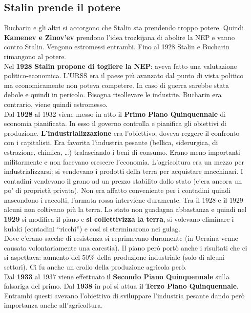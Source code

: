 \subsection{Stalin prende il potere}
Bucharin e gli altri si accorgono che Stalin sta prendendo troppo potere. Quindi \textbf{Kamenev e 
Zinov'ev} prendono l'idea trozkijana di abolire la NEP e vanno contro Stalin. Vengono estromessi 
entrambi. Fino al 1928 Stalin e Bucharin rimangono al potere.\\
Nel \textbf{1928 Stalin propone di togliere la NEP}: aveva fatto una valutazione politico-economica.
L'URSS era il paese più avanzato dal punto di vista politico ma economicamente non poteva competere.
In caso di guerra sarebbe stata debole e quindi in pericolo. Bisogna risollevare le industrie.
Bucharin era contrario, viene quindi estromesso.\\
Dal \textbf{1928} al 1932 viene messo in atto il \textbf{Primo Piano Quinquennale} di economia 
pianificata. In esso il governo controlla e pianifica gli obiettivi di produzione. 
\textbf{L'industrializzazione} era l'obiettivo, doveva reggere il confronto con i capitalisti. Era
favorita l'industria pesante (bellica, siderurgica, di estrazione, chimica, \ldots) tralasciando i
beni di consumo. Erano meno importanti militarmente e non facevano crescere l'economia. L'agricoltura
era un mezzo per industrializzarsi: si vendevano i prodotti della terra per acquistare macchinari.
I contadini vendevano il grano ad un prezzo stabilito dallo stato (c'era ancora un po' di proprietà
privata). Non era affatto conveniente per i contadini quindi nascondono i raccolti, l'armata rossa
interviene duramente. Tra il 1928 e il 1929 alcuni non coltivano più la terra. Lo stato non guadagna
abbastanza e quindi nel \textbf{1929} si modifica il piano e \textbf{si collettivizza la terra},
si volevano eliminare i kulaki (contadini ``ricchi'') e così si sterminarono nei gulag.\\
Dove c'erano sacche di resistenza si reprimevano duramente (in Ucraina venne causata volontariamente
una carestia). Il piano però portò anche i risultati che ci si aspettava: aumento del 50\% della
produzione industriale (solo di alcuni settori). Ci fu anche un crollo della produzione agricola 
però.\\
Dal \textbf{1933} al 1937 viene effettuato il \textbf{Secondo Piano Quinquennale} sulla falsariga
del primo. Dal \textbf{1938} in poi si attua il \textbf{Terzo Piano Quinquennale}. Entrambi questi
avevano l'obiettivo di sviluppare l'industria pesante dando però importanza anche all'agricoltura.
